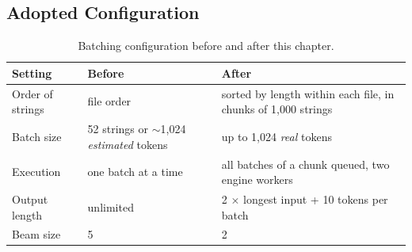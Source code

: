 \subsection{Adopted Configuration}
\begin{table}[H]
\centering
\caption[Adopted batching configuration]{Batching configuration before and after this chapter.}
\label{tab:adopted}
\begin{tabularx}{\linewidth}{@{}l L L@{}}
\toprule
\textbf{Setting} & \textbf{Before} & \textbf{After} \\
\midrule
Order of strings & file order & sorted by length within each file, in chunks of 1,000 strings \\
Batch size & 52 strings or $\sim$1,024 \emph{estimated} tokens & up to 1,024 \emph{real} tokens \\
Execution & one batch at a time & all batches of a chunk queued, two engine workers \\
Output length & unlimited & 2 $\times$ longest input + 10 tokens per batch \\
Beam size & 5 & 2 \\
\bottomrule
\end{tabularx}
\end{table}

